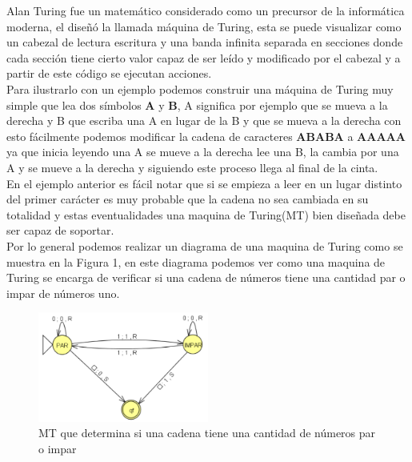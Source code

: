 \newpage

	Alan Turing fue un matemático considerado como un precursor de la informática moderna, el diseñó la llamada máquina de Turing, esta se puede visualizar como un cabezal de lectura escritura y una banda infinita separada en secciones donde cada sección tiene cierto valor capaz de ser leído y modificado por el cabezal y a partir de este código se ejecutan acciones. \\Para ilustrarlo con un ejemplo podemos construir una máquina de Turing muy simple que lea dos símbolos \textbf{A} y \textbf{B}, A significa por ejemplo que se mueva a la derecha y B que escriba una A en lugar de la B y que se mueva a la derecha con esto fácilmente podemos modificar la cadena de  caracteres \textbf{ABABA} a \textbf{AAAAA} ya que inicia leyendo una A se mueve a la derecha lee una B, la cambia por una A y se mueve a la derecha y siguiendo este proceso llega al final de la cinta. \\En el ejemplo anterior es fácil notar que si se empieza a leer  en un lugar distinto del primer carácter es muy probable que la cadena no sea cambiada en su totalidad y estas eventualidades una maquina de Turing(MT) bien diseñada debe ser capaz de soportar. \\ Por lo general podemos realizar un diagrama de una maquina de Turing como se muestra en la Figura 1, en este diagrama podemos ver como una maquina de Turing se encarga de verificar si una cadena de números tiene una cantidad par o impar de números uno.
\begin{figure}[H]
	\centering
	\includegraphics[width=0.5\textwidth]{./images/MAQTUR.png}
	\caption{MT que determina si una cadena tiene una cantidad de números par o impar}
\end{figure}
	
